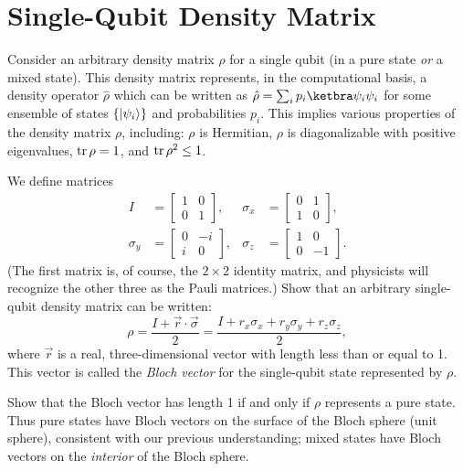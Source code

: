 \documentclass{../phys084}
\author {}
\date {2020 April 8}
\begin{document}
\section {Single-Qubit Density Matrix}

\begin {exercise}
  Consider an arbitrary density matrix \(\rho\) for a single qubit (in
  a pure state \textit{or} a mixed state).  This density matrix
  represents, in the computational basis, a density operator
  \(\hat \rho\) which can be written as
  \(\hat \rho = \sum_i p_i \proj {\psi_i}\) for some ensemble of
  states \(\{\lvert\psi_i\rangle\}\) and probabilities \(p_i\).  This
  implies various properties of the density matrix \(\rho\),
  including: \(\rho\) is Hermitian, \(\rho\) is diagonalizable with
  positive eigenvalues, \(\operatorname{tr} \rho = 1\), and \(\operatorname{tr} \rho^2 \le 1\).

  \begin {problems}
  \item We define matrices
    \begin {align*}
      I &= \begin {bmatrix} 1 & 0 \\ 0 & 1 \end {bmatrix}, &
      \sigma_x &= \begin {bmatrix} 0 & 1 \\ 1 & 0 \end {bmatrix}, \\
      \sigma_y &= \begin {bmatrix} 0 & -i \\ i & 0 \end {bmatrix}, &
      \sigma_z &= \begin {bmatrix} 1 & 0 \\ 0 & -1 \end {bmatrix}.
    \end {align*}
    (The first matrix is, of course, the \(2 \times 2\) identity
    matrix, and physicists will recognize the other three as the Pauli
    matrices.)  Show that an arbitrary single-qubit density matrix can
    be written:
    \[
      \rho = \frac {I + \vec r \cdot \vec \sigma} 2
      = \frac {I + r_x \sigma_x + r_y \sigma_y + r_z \sigma_z} 2,
    \]
    where \(\vec r\) is a real, three-dimensional vector with length
    less than or equal to 1.  This vector is called the \textit{Bloch
      vector} for the single-qubit state represented by \(\rho\).
  \item Show that the Bloch vector has length 1 if and only if
    \(\rho\) represents a pure state.  Thus pure states have Bloch
    vectors on the surface of the Bloch sphere (unit sphere),
    consistent with our previous understanding; mixed states have
    Bloch vectors on the \textit {interior} of the Bloch sphere.
  \end {problems}
\end {exercise}
\end{document}
